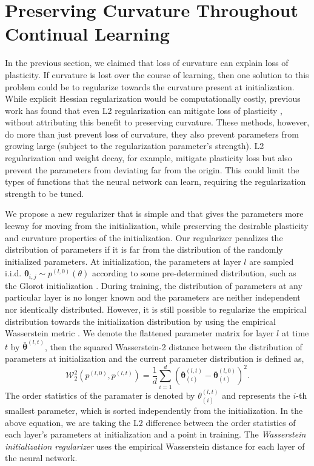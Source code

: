 \documentclass{article}
\begin{document}
\section{Preserving Curvature Throughout Continual Learning}
\vspace{-2mm}

In the previous section, we claimed that loss of curvature can explain loss of plasticity.
If curvature is lost over the course of learning, then one solution to this problem could be to regularize towards the curvature present at initialization.
While explicit Hessian regularization would be computationally costly, previous work has found that even L2 regularization can mitigate loss of plasticity \citep{kumar23_maint_plast_regen_regul,dohare21_contin_backp,lyle21_under_preven_capac_loss_reinf_learn}, without attributing this benefit to preserving curvature.
These methods, however, do more than just prevent loss of curvature, they also prevent parameters from growing large (subject to the regularization parameter's strength).
L2 regularization and weight decay, for example, mitigate plasticity loss but also prevent the parameters from deviating far from the origin.
This could limit the types of functions that the neural network can learn, requiring the regularization strength to be tuned.


We propose a new regularizer that is simple and that gives the parameters more leeway for moving from the initialization, while preserving the desirable plasticity and curvature properties of the initialization.
Our regularizer penalizes the distribution of parameters if it is far from the distribution of the randomly initialized parameters.
At initialization, the parameters at layer $l$ are sampled i.i.d. $\mathbf{\theta}_{i,j} \sim p^{(l,0)}(\theta)$ according to some pre-determined distribution, such as the Glorot initialization \citep{glorot10_under}.
During training, the distribution of parameters at any particular layer is no longer known and the parameters are neither independent nor identically distributed.
However, it is still possible to regularize the empirical distribution towards the initialization distribution by using the empirical Wasserstein metric \citep{bobkov19_one_kantor}.
We denote the flattened parameter matrix for layer $l$ at time $t$ by $\mathbf{\bar{\theta}}^{(l,t)}$, then the squared Wasserstein-2 distance between the distribution of parameters at initialization and the current parameter distribution is defined as,
$$ \mathcal{W}_2^2\left(p^{(l,0)},p^{(l,t)}\right) = \frac{1}{d}\sum_{i=1}^{d} \left(\mathbf{\bar{\theta}}_{(i)}^{(l,t)} - \mathbf{\bar{\theta}}_{(i)}^{(l,0)}\right)^{2}.$$
The order statistics of the paramater is denoted by  $\theta_{(i)}^{(l,t)}$ and represents the $i$-th smallest parameter, which is sorted independently from the initialization.
In the above equation, we are taking the L2 difference between the order statistics of each layer's parameters at initialization and a point in training.
The \textit{Wasserstein initialization regularizer} uses the empirical Wasserstein distance for each layer of the neural network.
\end{document}
